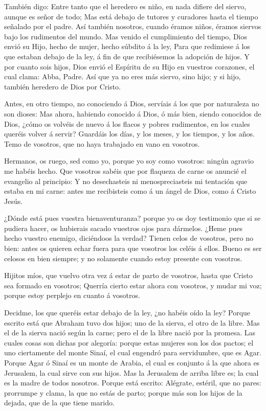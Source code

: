  También digo: Entre tanto que el heredero es niño, en nada
difiere del siervo, aunque es señor de todo;  Mas está
debajo de tutores y curadores hasta el tiempo señalado por el padre.
 Así también nosotros, cuando éramos niños, éramos siervos
bajo los rudimentos del mundo.  Mas venido el cumplimiento
del tiempo, Dios envió su Hijo, hecho de mujer, hecho súbdito á la ley,
 Para que redimiese á los que estaban debajo de la ley, á
fin de que recibiésemos la adopción de hijos.  Y por cuanto
sois hijos, Dios envió el Espíritu de su Hijo en vuestros corazones, el
cual clama: Abba, Padre.  Así que ya no eres más siervo,
sino hijo; y si hijo, también heredero de Dios por Cristo.

 Antes, en otro tiempo, no conociendo á Dios, servíais á los
que por naturaleza no son dioses:  Mas ahora, habiendo
conocido á Dios, ó más bien, siendo conocidos de Dios, ¿cómo os volvéis
de nuevo á los flacos y pobres rudimentos, en los cuales queréis volver
á servir?  Guardáis los días, y los meses, y los tiempos, y
los años.  Temo de vosotros, que no haya trabajado en vano
en vosotros.

 Hermanos, os ruego, sed como yo, porque yo soy como
vosotros: ningún agravio me habéis hecho.  Que vosotros
sabéis que por flaqueza de carne os anuncié el evangelio al principio:
 Y no desechasteis ni menospreciasteis mi tentación que
estaba en mi carne: antes me recibisteis como á un ángel de Dios, como á
Cristo Jesús.

 ¿Dónde está pues vuestra bienaventuranza? porque yo os doy
testimonio que si se pudiera hacer, os hubierais sacado vuestros ojos
para dármelos.  ¿Heme pues hecho vuestro enemigo,
diciéndoos la verdad?  Tienen celos de vosotros, pero no
bien: antes os quieren echar fuera para que vosotros los celéis á ellos.
 Bueno es ser celosos en bien siempre; y no solamente
cuando estoy presente con vosotros.

 Hijitos míos, que vuelvo otra vez á estar de parto de
vosotros, hasta que Cristo sea formado en vosotros; 
Querría cierto estar ahora con vosotros, y mudar mi voz; porque estoy
perplejo en cuanto á vosotros.

 Decidme, los que queréis estar debajo de la ley, ¿no
habéis oído la ley?  Porque escrito está que Abraham tuvo
dos hijos; uno de la sierva, el otro de la libre.  Mas el
de la sierva nació según la carne; pero el de la libre nació por la
promesa.  Las cuales cosas son dichas por alegoría: porque
estas mujeres son los dos pactos; el uno ciertamente del monte Sinaí, el
cual engendró para servidumbre, que es Agar.  Porque Agar ó
Sinaí es un monte de Arabia, el cual es conjunto á la que ahora es
Jerusalem, la cual sirve con sus hijos.  Mas la Jerusalem
de arriba libre es; la cual es la madre de todos nosotros. 
Porque está escrito: Alégrate, estéril, que no pares: prorrumpe y clama,
la que no estás de parto; porque más son los hijos de la dejada, que de
la que tiene marido.

